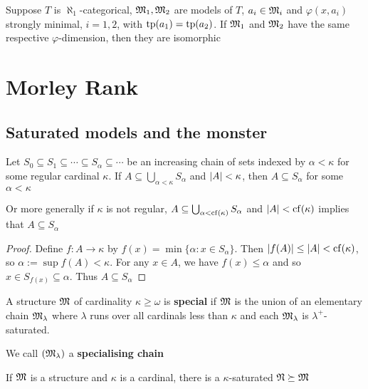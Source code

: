 \documentclass[11pt]{article}
\begin{document}
\begin{corollary}[]
Suppose \(T\) is \(\aleph_1\)-categorical, \(\mathfrak{M}_1,\mathfrak{M}_2\) are models of \(T\), \(a_i\in\mathfrak{M}_i\) and \(\varphi(x,a_i)\)
strongly minimal, \(i=1,2\), with \(\operatorname{tp}(a_1)=\operatorname{tp}(a_2)\). If \(\mathfrak{M}_1\) and \(\mathfrak{M}_2\) have the same
respective \(\varphi\)-dimension, then they are isomorphic
\end{corollary}
\section{Morley Rank}
\label{sec:org85f1079}
\subsection{Saturated models and the monster}
\label{sec:org805e0c1}
\begin{lemma}[]
\label{11-1}
Let \(S_0\subseteq S_1\subseteq\cdots\subseteq S_\alpha\subseteq\cdots\) be an increasing chain of sets indexed by \(\alpha<\kappa\) for some regular
cardinal \(\kappa\). If \(A\subseteq\bigcup_{\alpha<\kappa}S_\alpha\) and \(\abs{A}<\kappa\), then \(A\subseteq S_\alpha\) for some \(\alpha<\kappa\)

Or more generally if \(\kappa\) is not regular, \(A\subseteq\bigcup_{\alpha<\operatorname{cf}(\kappa)}S_\alpha\) and \(\abs{A}<\cf(\kappa)\) implies
that \(A\subseteq S_\alpha\)
\end{lemma}

\begin{proof}
Define \(f:A\to\kappa\) by \(f(x)=\min\{\alpha:x\in S_\alpha\}\). Then \(\abs{f(A)}\le\abs{A}<\cf(\kappa)\),
so \(\alpha:=\sup f(A)<\kappa\). For any \(x\in A\), we have \(f(x)\le\alpha\) and so \(x\in S_{f(x)}\subseteq\alpha\).
Thus \(A\subseteq S_\alpha\)
\end{proof}

\begin{definition}[]
A structure \(\mathfrak{M}\) of cardinality \(\kappa\ge\omega\) is \textbf{special} if \(\mathfrak{M}\) is the union of an elementary
chain \(\mathfrak{M}_\lambda\) where \(\lambda\) runs over all cardinals less than \(\kappa\) and each \(\mathfrak{M}_\lambda\) is \(\lambda^+\)-saturated.
\end{definition}


We call \((\mathfrak{M}_\lambda)\) a \textbf{specialising chain}

\begin{theorem}[]
If \(\mathfrak{M}\) is a structure and \(\kappa\) is a cardinal, there is a \(\kappa\)-saturated \(\mathfrak{N}\succeq\mathfrak{M}\)
\end{theorem}
\end{document}
